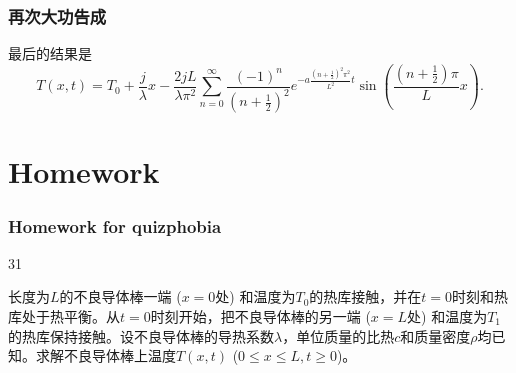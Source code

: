 \documentclass[CJK]{beamer}
\begin{document}
\begin{frame}
  \frametitle{再次大功告成}
  
  最后的结果是
  $$T(x,t) = T_0+\frac{j}{\lambda}x -\frac{2jL}{\lambda \pi^2}\sum_{n=0}^\infty \frac{(-1)^n}{\left(n+\frac{1}{2}\right)^2}e^{-a\frac{(n+\frac{1}{2})^2\pi^2}{L^2}t}\sin{\left(\frac{(n+\frac{1}{2})\pi}{L}x\right)}.$$
  
\end{frame}

\section{Homework}

\begin{frame}
  \frametitle{Homework for quizphobia}
  
  
  \bitem
\item[31]{长度为$L$的不良导体棒一端 ($x=0$处) 和温度为$T_0$的热库接触，并在$t=0$时刻和热库处于热平衡。从$t=0$时刻开始，把不良导体棒的另一端 ($x=L$处) 和温度为$T_1$的热库保持接触。设不良导体棒的导热系数$\lambda$，单位质量的比热$c$和质量密度$\rho$均已知。求解不良导体棒上温度$T(x, t)$ ($0\le x\le L, t\ge 0$)。

}
    \eitem

  
\end{frame}

\ech
\end{document}
